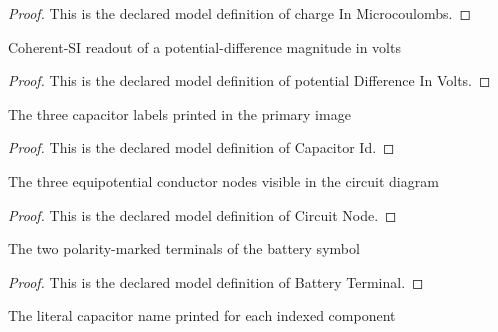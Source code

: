 \begin{proof}
  This is the declared model definition of charge In Microcoulombs.
\end{proof}
\begin{definition}
  \label{def:physics:phyx-mini-0880:phyxminiproblems-problemphyxmini0880-potentialdifferenceinvolts}
  Coherent-SI readout of a potential-difference magnitude in volts
\end{definition}
\begin{proof}
  This is the declared model definition of potential Difference In Volts.
\end{proof}
\begin{definition}[Capacitor Id]
  \label{def:physics:phyx-mini-0880:phyxminiproblems-problemphyxmini0880-capacitorid}
  The three capacitor labels printed in the primary image
\end{definition}
\begin{proof}
  This is the declared model definition of Capacitor Id.
\end{proof}
\begin{definition}
  \label{def:physics:phyx-mini-0880:phyxminiproblems-problemphyxmini0880-circuitnode}
  The three equipotential conductor nodes visible in the circuit diagram
\end{definition}
\begin{proof}
  This is the declared model definition of Circuit Node.
\end{proof}
\begin{definition}
  \label{def:physics:phyx-mini-0880:phyxminiproblems-problemphyxmini0880-batteryterminal}
  The two polarity-marked terminals of the battery symbol
\end{definition}
\begin{proof}
  This is the declared model definition of Battery Terminal.
\end{proof}
\begin{definition}
  \label{def:physics:phyx-mini-0880:phyxminiproblems-problemphyxmini0880-expectedcapacitorlabel}
  The literal capacitor name printed for each indexed component
\end{definition}

